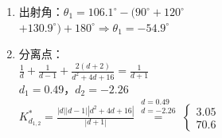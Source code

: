 \documentclass[handout,cjkutf8,table,aspectratio=1610]{beamer} %
\begin{document}
\begin{frame}{}
\begin{enumerate}[(1)]
		\item 出射角：$\theta_1 = 106.1^\circ - (90^\circ + 120^\circ $\\
		$+ 130.9^\circ) + 180^\circ \Rightarrow \theta_1 = -54.9^\circ$
		\item 分离点：\\
		$\frac{1}{d} + \frac{1}{d - 1} + \frac{2(d + 2)}{d^2 + 4d + 16} = \frac{1}{d+1}$\\
		$d_1 = 0.49$，$d_2 = -2.26$\\
		$K^*_{d_{1,2}} = \frac{|d||d - 1||d^2 + 4d + 16|}{|d + 1|} \overset{\begin{smallmatrix}d = 0.49\\ d = -2.26\end{smallmatrix}}{=} \left\{\begin{matrix}
			3.05\\
			70.6
		\end{matrix}\right.$
	\end{enumerate}
\end{frame}
\end{document}
